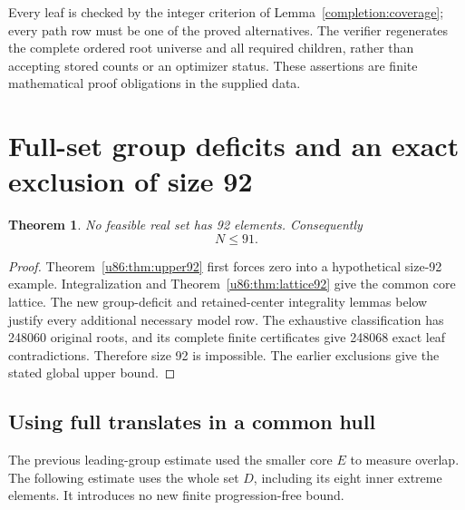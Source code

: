 \documentclass[11pt,a4paper]{article}
\newtheorem{theorem}{Theorem}[section]
\theoremstyle{remark}
\begin{document}
Every leaf is checked by the integer criterion of
Lemma~\ref{completion:coverage}; every path row must be one of the
proved alternatives. The verifier  regenerates
the complete ordered root universe and all required children, rather than
accepting stored counts or an optimizer status. These assertions are finite
mathematical proof obligations in the supplied data.



\section{Full-set group deficits and an exact exclusion of size 92}\label{u86:sec:upper91}
\begin{theorem}\label{u86:thm:upper91}
No feasible real set has 92 elements. Consequently
\[
 \boxed{N\le91.}
\]
\end{theorem}
\begin{proof}
Theorem~\ref{u86:thm:upper92} first forces zero into a hypothetical size-92
example. Integralization and Theorem~\ref{u86:thm:lattice92} give the common
core lattice. The new group-deficit and retained-center integrality
lemmas below justify every additional necessary model row. The exhaustive
classification has 248060 original roots, and its complete finite
certificates give 248068 exact leaf contradictions. Therefore
size 92 is impossible. The earlier exclusions give the stated global
upper bound.
\end{proof}

\subsection{Using full translates in a common hull}
The previous leading-group estimate used the smaller core $E$ to measure
overlap. The following estimate uses the whole set $D$, including its
eight inner extreme elements. It introduces no new finite
progression-free bound.
\end{document}
